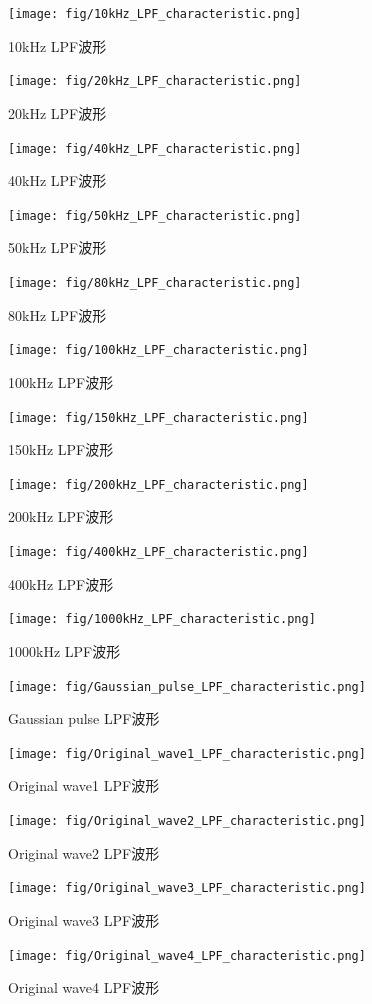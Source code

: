 \documentclass[11pt,dvipdfmx]{jarticle}
\begin{document}
\begin{figure}[H]
  \centering
  \texttt{[image: fig/10kHz\_LPF\_characteristic.png]}
  \caption{10kHz LPF波形}
\end{figure}
\begin{figure}[H]
  \centering
  \texttt{[image: fig/20kHz\_LPF\_characteristic.png]}
  \caption{20kHz LPF波形}
\end{figure}
\begin{figure}[H]
  \centering
  \texttt{[image: fig/40kHz\_LPF\_characteristic.png]}
  \caption{40kHz LPF波形}
\end{figure}
\begin{figure}[H]
  \centering
  \texttt{[image: fig/50kHz\_LPF\_characteristic.png]}
  \caption{50kHz LPF波形}
\end{figure}
\begin{figure}[H]
  \centering
  \texttt{[image: fig/80kHz\_LPF\_characteristic.png]}
  \caption{80kHz LPF波形}
\end{figure}
\begin{figure}[H]
  \centering
  \texttt{[image: fig/100kHz\_LPF\_characteristic.png]}
  \caption{100kHz LPF波形}
\end{figure}
\begin{figure}[H]
  \centering
  \texttt{[image: fig/150kHz\_LPF\_characteristic.png]}
  \caption{150kHz LPF波形}
\end{figure}
\begin{figure}[H]
  \centering
  \texttt{[image: fig/200kHz\_LPF\_characteristic.png]}
  \caption{200kHz LPF波形}
\end{figure}
\begin{figure}[H]
  \centering
  \texttt{[image: fig/400kHz\_LPF\_characteristic.png]}
  \caption{400kHz LPF波形}
\end{figure}
\begin{figure}[H]
  \centering
  \texttt{[image: fig/1000kHz\_LPF\_characteristic.png]}
  \caption{1000kHz LPF波形}
\end{figure}
\begin{figure}[H]
  \centering
  \texttt{[image: fig/Gaussian\_pulse\_LPF\_characteristic.png]}
  \caption{Gaussian pulse LPF波形}
\end{figure}
\begin{figure}[H]
  \centering
  \texttt{[image: fig/Original\_wave1\_LPF\_characteristic.png]}
  \caption{Original wave1 LPF波形}
\end{figure}
\begin{figure}[H]
  \centering
  \texttt{[image: fig/Original\_wave2\_LPF\_characteristic.png]}
  \caption{Original wave2 LPF波形}
\end{figure}
\begin{figure}[H]
  \centering
  \texttt{[image: fig/Original\_wave3\_LPF\_characteristic.png]}
  \caption{Original wave3 LPF波形}
\end{figure}
\begin{figure}[H]
  \centering
  \texttt{[image: fig/Original\_wave4\_LPF\_characteristic.png]}
  \caption{Original wave4 LPF波形}
\end{figure}
\end{document}
